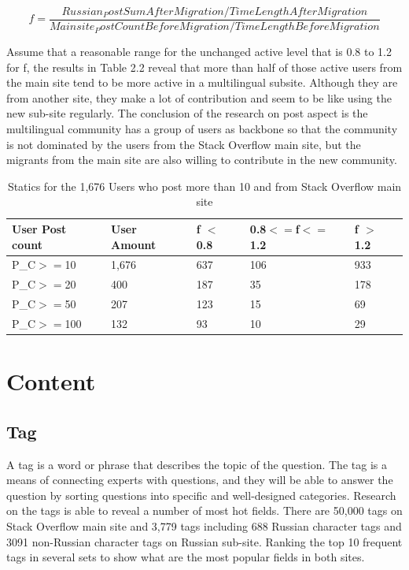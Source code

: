 \begin{normalsize}

	\begin{equation}
	f = \frac{Russian_PostSumAfterMigration/TimeLengthAfterMigration}{  Mainsite_PostCountBeforeMigration /TimeLengthBeforeMigration}	 
	\end{equation}
\end{normalsize}
\par
Assume that a reasonable range for the unchanged active level that is 0.8 to 1.2 for f, the results in Table 2.2 reveal that more than half of those active users from the main site tend to be more active in a multilingual sub\-site. Although they are from another site, they make a lot of contribution and seem to be like using the new sub-site regularly. The conclusion of the research on post aspect is the multilingual community has a group of users as backbone so that the community is not dominated by the users from the Stack Overflow main site, but the migrants from the main site are also willing to contribute in the new community.
\begin{table}[!h]
	\centering
	\caption{Statics for the 1,676 Users who post more than 10 and from Stack Overflow main site}
	\label{tab:table3}
	\begin{tabular}{|p{2.1cm}|p{2.2cm}|p{2.2cm}|p{2.2cm}|p{2.2cm}|}
		User Post count & User Amount & f $<$ 0.8 & 0.8$<=$f$<=$1.2 &f $>$ 1.2 \\
		\hline
		P\_C$>=$10 & 1,676  &637 & 106 & 933   \\
		P\_C$>=$20 & 400  & 187 & 35 & 178\\
		P\_C$>=$50 & 207 & 123 & 15 & 69 \\
		P\_C$>=$100& 132 & 93 & 10 & 29 \\
	\end{tabular}
\end{table}	

\section{Content}

\subsection{Tag}
A tag is a word or phrase that describes the topic of the question. The tag is a means of connecting experts with questions, and they will be able to answer the question by sorting questions into specific and well-designed categories. Research on the tags is able to reveal a number of most hot fields. There are 50,000 tags on Stack Overflow main site and 3,779 tags including 688 Russian character tags and 3091 non-Russian character tags on Russian sub-site. Ranking the top 10 frequent tags in several sets to show what are the most popular fields in both sites.
\par

